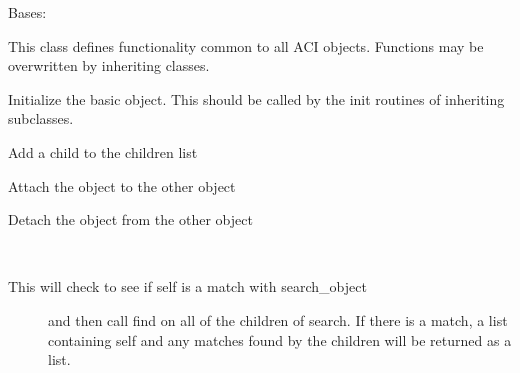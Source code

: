 \documentclass[letterpaper,10pt,english]{sphinxmanual}
\begin{document}
\begin{fulllineitems}
\label{acibaseobject:acibaseobject.BaseACIObject}
Bases: 

This class defines functionality common to all ACI objects.
Functions may be overwritten by inheriting classes.

Initialize the basic object.  This should be called by the
init routines of inheriting subclasses.

\begin{fulllineitems}
\label{acibaseobject:acibaseobject.BaseACIObject.add_child}
Add a child to the children list

\end{fulllineitems}


\begin{fulllineitems}
\label{acibaseobject:acibaseobject.BaseACIObject.attach}
Attach the object to the other object

\end{fulllineitems}


\begin{fulllineitems}
\label{acibaseobject:acibaseobject.BaseACIObject.detach}
Detach the object from the other object

\end{fulllineitems}


\begin{fulllineitems}
\label{acibaseobject:acibaseobject.BaseACIObject.find}~\begin{description}
\item[{This will check to see if self is a match with search\_object}] \leavevmode
and then call find on all of the children of search.
If there is a match, a list containing self and any matches found
by the children will be returned as a list.


\end{description}
\end{fulllineitems}
\end{fulllineitems}
\end{document}
